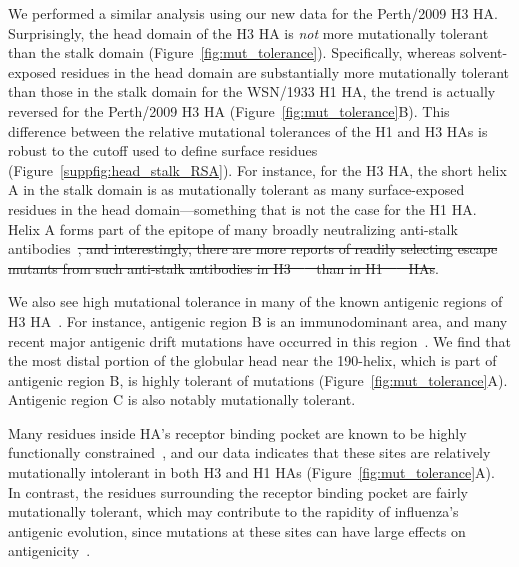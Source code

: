 \documentclass[9pt,twocolumn,twoside]{pnas-new}
\providecommand{\DIFdel}[1]{{\protect\color{red}\sout{#1}}}                      %
\providecommand{\DIFdelbegin}{} %
\providecommand{\DIFdelend}{} %
\begin{document}
We performed a similar analysis using our new data for the Perth/2009 H3 HA.
Surprisingly, the head domain of the H3 HA is \emph{not} more mutationally tolerant than the stalk domain (Figure~\ref{fig:mut_tolerance}).
Specifically, whereas solvent-exposed residues in the head domain are substantially more mutationally tolerant than those in the stalk domain for the WSN/1933 H1 HA, the trend is actually reversed for the Perth/2009 H3 HA (Figure~\ref{fig:mut_tolerance}B).
This difference between the relative mutational tolerances of the H1 and H3 HAs is robust to the cutoff used to define surface residues (Figure~\ref{suppfig:head_stalk_RSA}).
For instance, for the H3 HA, the short helix A in the stalk domain is as mutationally tolerant as many surface-exposed residues in the head domain---something that is not the case for the H1 HA.
Helix A forms part of the epitope of many broadly neutralizing anti-stalk antibodies~\cite{mallajosyula2014influenza,laursen2013broadly,chai2016two}\DIFdelbegin \DIFdel{, and interestingly, there are more reports of readily selecting escape mutants from such anti-stalk antibodies in H3~\mbox{%
\cite{ekiert2011highly, friesen2014common, chai2016two, yamayoshi2017human} }%
than in H1~\mbox{%
\cite{okuno1993common,doud2018quantifying,anderson2017natural} }%
HAs}\DIFdelend .

We also see high mutational tolerance in many of the known antigenic regions of H3 HA~\cite{wiley1981structural}.
For instance, antigenic region B is an immunodominant area, and many recent major antigenic drift mutations have occurred in this region~\cite{chambers2015identification,koel2013substitutions,popova2012immunodominance}.
We find that the most distal portion of the globular head near the 190-helix, which is part of antigenic region B, is highly tolerant of mutations (Figure~\ref{fig:mut_tolerance}A).
Antigenic region C is also notably mutationally tolerant.

Many residues inside HA's receptor binding pocket are known to be highly functionally constrained~\cite{wilson1981structure,martin1998studies}, and our data indicates that these sites are relatively mutationally intolerant in both H3 and H1 HAs (Figure~\ref{fig:mut_tolerance}A).
In contrast, the residues surrounding the receptor binding pocket are fairly mutationally tolerant, which may contribute to the rapidity of influenza's antigenic evolution, since mutations at these sites can have large effects on antigenicity~\cite{wiley1981structural,koel2013substitutions}.
\end{document}
